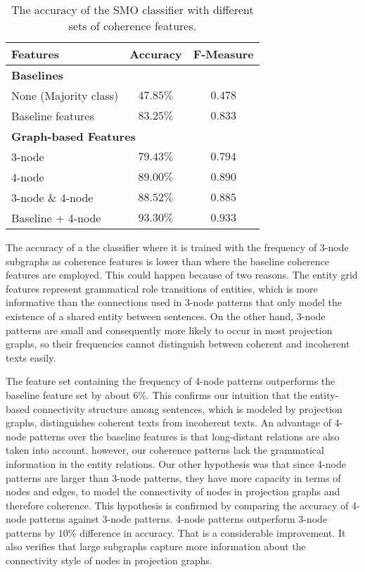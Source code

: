 \begin{table}[!ht]
	\begin{center}
		\begin{tabular}{lcc}
			\hline
			Features 						  & Accuracy		& F-Measure	\\
			\hline
			\multicolumn{2}{l}{\textbf{Baselines}}								\\
			None (Majority class) 			  & $47.85\%$		& $0.478$		\\
			Baseline features 			  	  & $83.25\%$     	& $0.833$		\\
			\hline
		
			\multicolumn{2}{l}{\textbf{Graph-based Features}}					\\
			3-node 							  & $79.43\%$		& $0.794$		\\
			4-node 						      & $89.00\%$		& $0.890$		\\
			3-node \& 4-node 				  & $88.52\%$		& $0.885$		\\
			Baseline + 4-node 				  & $93.30\%$		& $0.933$		\\
			\hline
		\end{tabular}
	\end{center}
	\caption{The accuracy of the SMO classifier with different sets of coherence features.}
	\label{tab:ranking-pitler}
\end{table}

The accuracy of a the classifier where it is trained with the frequency of 3-node subgraphs as coherence features is lower than where the baseline coherence features are employed.  
This could happen because of two reasons. 
The entity grid features represent grammatical role transitions of entities, which is more informative than the connections used in 3-node patterns that only model the existence of a shared entity between sentences. 
On the other hand, 3-node patterns are small and consequently more likely to occur in most projection graphs, so their frequencies cannot distinguish between coherent and incoherent texts easily. 

The feature set containing the frequency of 4-node patterns outperforms the baseline feature set by about $6\%$. 
This confirms our intuition that the entity-based connectivity structure among sentences, which is modeled by projection graphs, distinguishes coherent texts from incoherent texts. 
An advantage of 4-node patterns over the baseline features is that long-distant relations are also taken into account. 
however, our coherence patterns lack the grammatical information in the entity relations. 
Our other hypothesis was that since 4-node patterns are larger than 3-node patterns, they have more capacity in terms of nodes and edges, to model the connectivity of nodes in projection graphs and therefore coherence. 
This hypothesis is confirmed by comparing the accuracy of 4-node patterns against 3-node patterns.
4-node patterns outperform 3-node patterns by $10\%$ difference in accuracy. 
That is a considerable improvement. 
It also verifies that large subgraphs capture more information about the connectivity style of nodes in projection graphs.    

